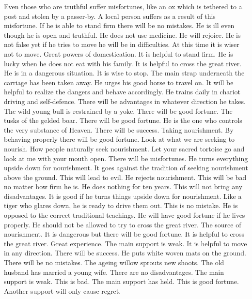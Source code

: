 	{Even those who are truthful suffer misfortunes, like an ox which is tethered to a post and stolen by
		a passer-by. A local person suffers as a result of this misfortune.}
	{If he is able to stand firm there will be no mistakes.}
	{He is ill even though he is open and truthful. He does not use medicine. He will rejoice.}
	{He is not false yet if he tries to move he will be in difficulties. At this time it is wiser not to move.}
\or {}
	{Great powers of domestication. It is helpful to stand firm. He is lucky when he does not eat with his
		family. It is helpful to cross the great river.}
	{He is in a dangerous situation. It is wise to stop.}
	{The main strap underneath the carriage has been taken away.}
	{He urges his good horse to travel on. It will be helpful to realize the dangers and behave accordingly.
		He trains daily in chariot driving and self-defence. There will be advantages in whatever direction he
		takes.}
	{The wild young bull is restrained by a yoke. There will be good fortune.}
	{The tusks of the gelded boar. There will be good fortune.}
	{He is the one who controls the very substance of Heaven. There will be success.}
\or {}
	{Taking nourishment. By behaving properly there will be good fortune. Look at what we are seeking to nourish.
		How people naturally seek nourishment.}
	{Let your sacred tortoise go and look at me with your mouth open. There will be misfortunes.}
	{He turns everything upside down for nourishment. It goes against the tradition of seeking
		nourishment above the ground. This will lead to evil.}
	{He rejects nourishment. This will be bad no matter how firm he is. He does nothing for ten
		years. This will not bring any disadvantages.}
	{It is good if he turns things upside down for nourishment. Like a tiger who glares down, he is ready
		to drive them out. This is no mistake.}
	{He is opposed to the correct traditional teachings. He will have good fortune if he lives properly.
		He should not be allowed to try to cross the great river.}
	{The source of nourishment. It is dangerous but there will be good fortune. It is helpful to
		cross the great river.}
\or {}
	{Great experience. The main support is weak. It is helpful to move in any direction. There will be success.}
	{He puts white woven mats on the ground. There will be no mistakes.}
	{The ageing willow sprouts new shoots. The old husband has married a young wife. There are no disadvantages.}
	{The main support is weak. This is bad.}
	{The main support has held. This is good fortune. Another support will only cause regret.}
